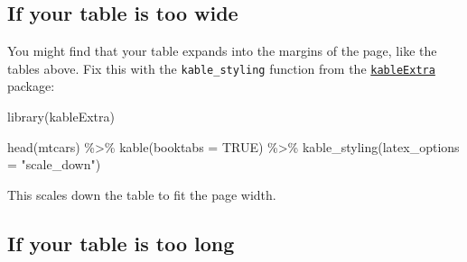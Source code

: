 \documentclass[a4paper, nobind]{templates/ociamthesis}
\newenvironment{Shaded}{\begin{snugshade}}{\end{snugshade}}
\newcommand{\AttributeTok}[1]{\textcolor[rgb]{0.77,0.63,0.00}{#1}}
\newcommand{\ConstantTok}[1]{\textcolor[rgb]{0.00,0.00,0.00}{#1}}
\newcommand{\FunctionTok}[1]{\textcolor[rgb]{0.00,0.00,0.00}{#1}}
\newcommand{\NormalTok}[1]{#1}
\newcommand{\SpecialCharTok}[1]{\textcolor[rgb]{0.00,0.00,0.00}{#1}}
\newcommand{\StringTok}[1]{\textcolor[rgb]{0.31,0.60,0.02}{#1}}
\renewenvironment{Shaded}
{
  \vspace{10pt}%
  \begin{snugshade}%
}{%
  \end{snugshade}%
  \vspace{8pt}%
}
\begin{document}
\hypertarget{if-your-table-is-too-wide}{%
\subsection{If your table is too wide}\label{if-your-table-is-too-wide}}

You might find that your table expands into the margins of the page, like the tables above.
Fix this with the \texttt{kable\_styling} function from the \href{https://haozhu233.github.io/kableExtra/}{\texttt{kableExtra}} package:

\begin{Shaded}
\begin{Highlighting}[]
\FunctionTok{library}\NormalTok{(kableExtra)}

\FunctionTok{head}\NormalTok{(mtcars) }\SpecialCharTok{\%\textgreater{}\%} 
  \FunctionTok{kable}\NormalTok{(}\AttributeTok{booktabs =} \ConstantTok{TRUE}\NormalTok{) }\SpecialCharTok{\%\textgreater{}\%} 
  \FunctionTok{kable\_styling}\NormalTok{(}\AttributeTok{latex\_options =} \StringTok{"scale\_down"}\NormalTok{)}
\end{Highlighting}
\end{Shaded}

\begin{table}
\centering
{}
\end{table}

This scales down the table to fit the page width.

\hypertarget{if-your-table-is-too-long}{%
\subsection{If your table is too long}\label{if-your-table-is-too-long}}
\end{document}
